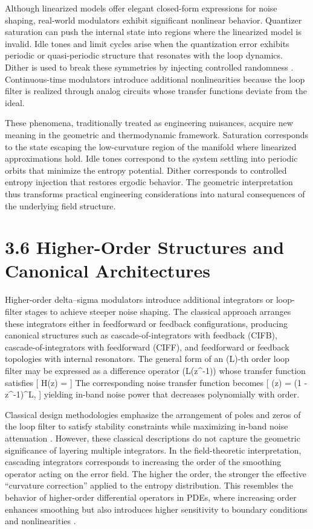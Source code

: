 Although linearized models offer elegant closed-form expressions for noise shaping, real-world modulators exhibit significant nonlinear behavior. Quantizer saturation can push the internal state into regions where the linearized model is invalid. Idle tones and limit cycles arise when the quantization error exhibits periodic or quasi-periodic structure that resonates with the loop dynamics. Dither is used to break these symmetries by injecting controlled randomness \citep{jayant1993digital}. Continuous-time modulators introduce additional nonlinearities because the loop filter is realized through analog circuits whose transfer functions deviate from the ideal.

These phenomena, traditionally treated as engineering nuisances, acquire new meaning in the geometric and thermodynamic framework. Saturation corresponds to the state escaping the low-curvature region of the manifold where linearized approximations hold. Idle tones correspond to the system settling into periodic orbits that minimize the entropy potential. Dither corresponds to controlled entropy injection that restores ergodic behavior. The geometric interpretation thus transforms practical engineering considerations into natural consequences of the underlying field structure.

\section*{3.6 Higher-Order Structures and Canonical Architectures}

Higher-order delta--sigma modulators introduce additional integrators or loop-filter stages to achieve steeper noise shaping. The classical approach arranges these integrators either in feedforward or feedback configurations, producing canonical structures such as cascade-of-integrators with feedback (CIFB), cascade-of-integrators with feedforward (CIFF), and feedforward or feedback topologies with internal resonators. The general form of an (L)-th order loop filter may be expressed as a difference operator (L(z^{-1})) whose transfer function satisfies
[
H(z) =  \quad {}
]
The corresponding noise transfer function becomes
[
(z) = (1 - z^{-1})^L,
]
yielding in-band noise power that decreases polynomially with order.

Classical design methodologies emphasize the arrangement of poles and zeros of the loop filter to satisfy stability constraints while maximizing in-band noise attenuation \citep{schreier2005understanding}. However, these classical descriptions do not capture the geometric significance of layering multiple integrators. In the field-theoretic interpretation, cascading integrators corresponds to increasing the order of the smoothing operator acting on the error field. The higher the order, the stronger the effective ``curvature correction'' applied to the entropy distribution. This resembles the behavior of higher-order differential operators in PDEs, where increasing order enhances smoothing but also introduces higher sensitivity to boundary conditions and nonlinearities \citep{arnold1989mathematical}.

